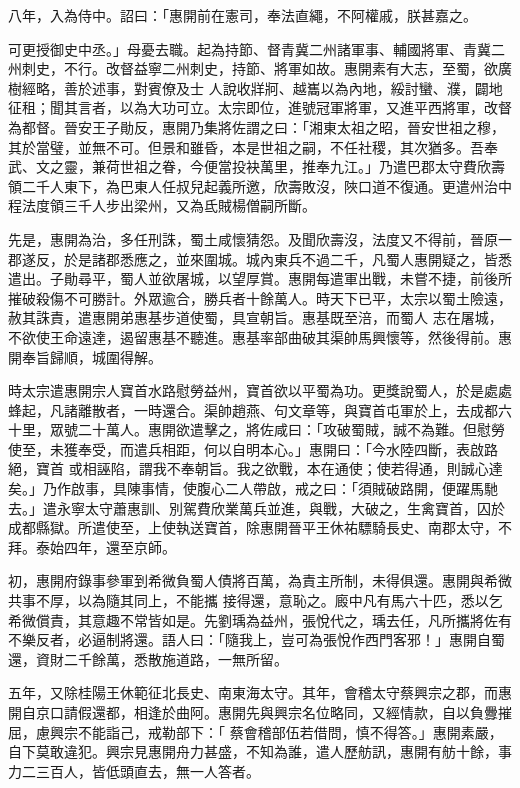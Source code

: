 \begin{pinyinscope}
 八年，入為侍中。詔曰：「惠開前在憲司，奉法直繩，不阿權戚，朕甚嘉之。



 可更授御史中丞。」母憂去職。起為持節、督青冀二州諸軍事、輔國將軍、青冀二州刺史，不行。改督益寧二州刺史，持節、將軍如故。惠開素有大志，至蜀，欲廣樹經略，善於述事，對賓僚及士
 人說收牂牁、越巂以為內地，綏討蠻、濮，闢地征租；聞其言者，以為大功可立。太宗即位，進號冠軍將軍，又進平西將軍，改督為都督。晉安王子勛反，惠開乃集將佐謂之曰：「湘東太祖之昭，晉安世祖之穆，其於當璧，並無不可。但景和雖昏，本是世祖之嗣，不任社稷，其次猶多。吾奉武、文之靈，兼荷世祖之眷，今便當投袂萬里，推奉九江。」乃遣巴郡太守費欣壽領二千人東下，為巴東人任叔兒起義所邀，欣壽敗沒，陜口道不復通。更遣州治中
 程法度領三千人步出梁州，又為氐賊楊僧嗣所斷。



 先是，惠開為治，多任刑誅，蜀土咸懷猜怨。及聞欣壽沒，法度又不得前，晉原一郡遂反，於是諸郡悉應之，並來圍城。城內東兵不過二千，凡蜀人惠開疑之，皆悉遣出。子勛尋平，蜀人並欲屠城，以望厚賞。惠開每遣軍出戰，未嘗不捷，前後所摧破殺傷不可勝計。外眾逾合，勝兵者十餘萬人。時天下已平，太宗以蜀土險遠，赦其誅責，遣惠開弟惠基步道使蜀，具宣朝旨。惠基既至涪，而蜀人
 志在屠城，不欲使王命遠達，遏留惠基不聽進。惠基率部曲破其渠帥馬興懷等，然後得前。惠開奉旨歸順，城圍得解。



 時太宗遣惠開宗人寶首水路慰勞益州，寶首欲以平蜀為功。更獎說蜀人，於是處處蜂起，凡諸離散者，一時還合。渠帥趙燕、句文章等，與寶首屯軍於上，去成都六十里，眾號二十萬人。惠開欲遣擊之，將佐咸曰：「攻破蜀賊，誠不為難。但慰勞使至，未獲奉受，而遣兵相距，何以自明本心。」惠開曰：「今水陸四斷，表啟路絕，寶首
 或相誣陷，謂我不奉朝旨。我之欲戰，本在通使；使若得通，則誠心達矣。」乃作啟事，具陳事情，使腹心二人帶啟，戒之曰：「須賊破路開，便躍馬馳去。」遣永寧太守蕭惠訓、別駕費欣業萬兵並進，與戰，大破之，生禽寶首，囚於成都縣獄。所遣使至，上使執送寶首，除惠開晉平王休祐驃騎長史、南郡太守，不拜。泰始四年，還至京師。



 初，惠開府錄事參軍到希微負蜀人債將百萬，為責主所制，未得俱還。惠開與希微共事不厚，以為隨其同上，不能攜
 接得還，意恥之。廄中凡有馬六十匹，悉以乞希微償責，其意趣不常皆如是。先劉瑀為益州，張悅代之，瑀去任，凡所攜將佐有不樂反者，必逼制將還。語人曰：「隨我上，豈可為張悅作西門客邪！」惠開自蜀還，資財二千餘萬，悉散施道路，一無所留。



 五年，又除桂陽王休範征北長史、南東海太守。其年，會稽太守蔡興宗之郡，而惠開自京口請假還都，相逢於曲阿。惠開先與興宗名位略同，又經情款，自以負釁摧屈，慮興宗不能詣己，戒勒部下：「
 蔡會稽部伍若借問，慎不得答。」惠開素嚴，自下莫敢違犯。興宗見惠開舟力甚盛，不知為誰，遣人歷舫訊，惠開有舫十餘，事力二三百人，皆低頭直去，無一人答者。




\end{pinyinscope}

